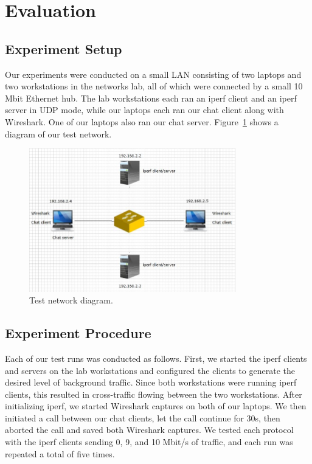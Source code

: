 
\section{Evaluation}

\subsection{Experiment Setup}

Our experiments were conducted on a small LAN consisting of two laptops and two
workstations in the networks lab, all of which were connected by a small 10 Mbit
Ethernet hub. The lab workstations each ran an iperf client and an iperf server
in UDP mode, while our laptops each ran our chat client along with Wireshark.
One of our laptops also ran our chat server. Figure~\ref{fig:test_network} shows a
diagram of our test network.

\begin{figure}[!t]
   \centering
      \includegraphics[width=0.8\textwidth]{pics/network_diagram}
   \caption{Test network diagram.}
\label{fig:test_network}
\end{figure}

\subsection{Experiment Procedure}

Each of our test runs was conducted as follows. First, we started the iperf
clients and servers on the lab workstations and configured the clients to
generate the desired level of background traffic. Since both workstations were
running iperf clients, this resulted in cross-traffic flowing between the two
workstations. After initializing iperf, we started Wireshark captures on both of
our laptops. We then initiated a call between our chat clients, let the call
continue for 30s, then aborted the call and saved both Wireshark captures. We
tested each protocol with the iperf clients sending 0, 9, and 10 Mbit/s of
traffic, and each run was repeated a total of five times.

